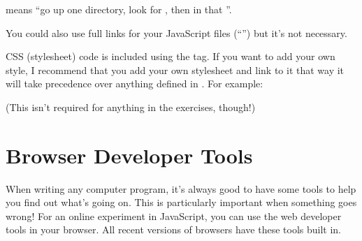 \documentclass[letterpaper,10pt,english]{sphinxmanual}
\begin{document}
\begin{sphinxVerbatim}[commandchars=\\\{\}]
 
\end{sphinxVerbatim}

means “go up one directory, look for , then in that
”.

You could also use full links for your JavaScript files
(“”) but it’s not necessary.

CSS (stylesheet) code is included using the  tag. If you want to
add your own style, I recommend that you add your own stylesheet and link to it
 \textendash{} that way it will take precedence over anything defined in
. For example:

\begin{sphinxVerbatim}[commandchars=\\\{\}]
   
   
\end{sphinxVerbatim}

(This isn’t required for anything in the exercises, though!)


\section{Browser Developer Tools}
\label{\detokenize{jspsych_au:browser-developer-tools}}
When writing any computer program, it’s always good to have
some tools to help you find out what’s going on. This is
particularly important when something goes wrong! For an
online experiment in JavaScript, you can use the
web developer tools in your browser. All recent versions of
browsers have these tools built in.
\end{document}
